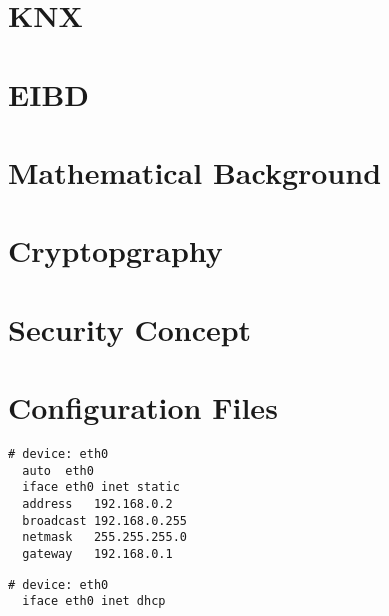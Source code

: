 \documentclass[a4paper,11pt,oneside,openany]{memoir}
\begin{document}


\chapter{KNX}
\label{ch:knx}


\chapter{EIBD}
\label{ch:eibd}


\chapter{Mathematical Background}
\label{ch:SOAmath}


\chapter{Cryptopgraphy}
\label{ch:SOAcryptography}


\chapter{Security Concept}
\label{ch:security}



\appendix

\nocite{*}	%
\printbibliography


\printglossary

\chapter{Configuration Files}

\begin{lstlisting}[style=BashInputStyle,caption={Raspbian configuration for static ip address},label=lst:staticIP]
# device: eth0
  auto  eth0
  iface eth0 inet static
  address   192.168.0.2
  broadcast 192.168.0.255
  netmask   255.255.255.0
  gateway   192.168.0.1
\end{lstlisting}

\begin{lstlisting}[style=BashInputStyle,caption={Raspbian configuration for dynamic ip address},label=lst:dynamicIP]
# device: eth0
  iface eth0 inet dhcp
\end{lstlisting}

\end{document}
